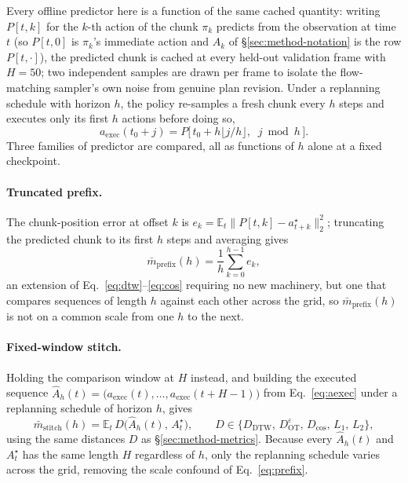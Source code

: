 \documentclass[english,12pt,a4paper,pdftex,elec,utf8]{aaltothesis}
\begin{document}
Every offline predictor here is a function of the same cached quantity: writing $P[t,k]$ for the $k$-th action of the chunk $\pi_k$ predicts from the observation at time $t$ (so $P[t,0]$ is $\pi_k$'s immediate action and $A_k$ of \S\ref{sec:method-notation} is the row $P[t,\cdot]$), the predicted chunk is cached at every held-out validation frame with $H{=}50$; two independent samples are drawn per frame to isolate the flow-matching sampler's own noise from genuine plan revision. Under a replanning schedule with horizon $h$, the policy re-samples a fresh chunk every $h$ steps and executes only its first $h$ actions before doing so,
\begin{equation}
  a_{\mathrm{exec}}(t_0{+}j) = P\big[\,t_0+h\lfloor j/h\rfloor,\;\; j\bmod h\,\big].
  \label{eq:aexec}
\end{equation}
Three families of predictor are compared, all as functions of $h$ alone at a fixed checkpoint.

\paragraph{Truncated prefix.} The chunk-position error at offset $k$ is $e_k=\mathbb E_t\lVert P[t,k]-a^\star_{t+k}\rVert_2^2$; truncating the predicted chunk to its first $h$ steps and averaging gives
\begin{equation}
  \bar m_{\mathrm{prefix}}(h) = \frac1h\sum_{k=0}^{h-1} e_k,
  \label{eq:prefix}
\end{equation}
an extension of Eq.~\ref{eq:dtw}--\ref{eq:cos} requiring no new machinery, but one that compares sequences of length $h$ against each other across the grid, so $\bar m_{\mathrm{prefix}}(h)$ is not on a common scale from one $h$ to the next.

\paragraph{Fixed-window stitch.} Holding the comparison window at $H$ instead, and building the executed sequence $\hat A_h(t)=\big(a_{\mathrm{exec}}(t),\dots,a_{\mathrm{exec}}(t{+}H{-}1)\big)$ from Eq.~\ref{eq:aexec} under a replanning schedule of horizon $h$, gives
\begin{equation}
  \bar m_{\mathrm{stitch}}(h) = \mathbb E_t\, D\big(\hat A_h(t),\, A^\star_t\big),
  \qquad D\in\{D_{\mathrm{DTW}},\,D^\varepsilon_{\mathrm{OT}},\,D_{\cos},\,L_1,\,L_2\},
  \label{eq:stitch}
\end{equation}
using the same distances $D$ as \S\ref{sec:method-metrics}. Because every $\hat A_h(t)$ and $A^\star_t$ has the same length $H$ regardless of $h$, only the replanning schedule varies across the grid, removing the scale confound of Eq.~\ref{eq:prefix}.
\end{document}
